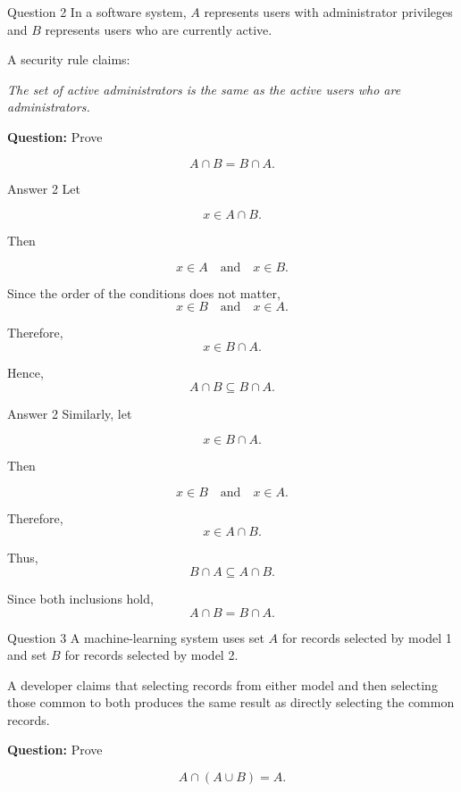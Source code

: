 
\begin{frame}{Question 2}
In a software system, $A$ represents users with administrator privileges and $B$ represents users who are currently active.

A security rule claims:

\textit{The set of active administrators is the same as the active users who are administrators.}

\textbf{Question:} Prove

$$
A\cap B=B\cap A.
$$

\end{frame}

\begin{frame}{Answer 2}
Let

$$
x\in A\cap B.
$$

Then

$$
x\in A
\quad\text{and}\quad
x\in B.
$$

Since the order of the conditions does not matter,
$$
x\in B
\quad\text{and}\quad
x\in A.
$$

Therefore,
$$
x\in B\cap A.
$$

Hence,
$$
A\cap B\subseteq B\cap A.
$$

\end{frame}

\begin{frame}{Answer 2}
Similarly, let

$$
x\in B\cap A.
$$

Then

$$
x\in B
\quad\text{and}\quad
x\in A.
$$

Therefore,
$$
x\in A\cap B.
$$

Thus,
$$
B\cap A\subseteq A\cap B.
$$

Since both inclusions hold,
$$
\boxed{A\cap B=B\cap A}.
$$

\end{frame}


\begin{frame}{Question 3}
A machine-learning system uses set $A$ for records selected by model 1 and set $B$ for records selected by model 2.

A developer claims that selecting records from either model and then selecting those common to both produces the same result as directly selecting the common records.

\textbf{Question:} Prove

$$
A\cap(A\cup B)=A.
$$

\end{frame}

